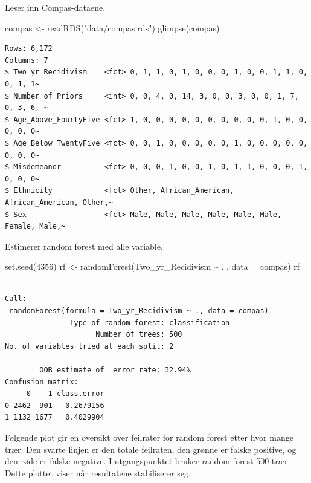 \documentclass[
  letterpaper,
  DIV=11,
  numbers=noendperiod]{scrreprt}
\newenvironment{Shaded}{\begin{snugshade}}{\end{snugshade}}
\newcommand{\AttributeTok}[1]{\textcolor[rgb]{0.40,0.45,0.13}{#1}}
\newcommand{\DecValTok}[1]{\textcolor[rgb]{0.68,0.00,0.00}{#1}}
\newcommand{\FunctionTok}[1]{\textcolor[rgb]{0.28,0.35,0.67}{#1}}
\newcommand{\NormalTok}[1]{\textcolor[rgb]{0.00,0.23,0.31}{#1}}
\newcommand{\OtherTok}[1]{\textcolor[rgb]{0.00,0.23,0.31}{#1}}
\newcommand{\SpecialCharTok}[1]{\textcolor[rgb]{0.37,0.37,0.37}{#1}}
\newcommand{\StringTok}[1]{\textcolor[rgb]{0.13,0.47,0.30}{#1}}
\begin{document}
Leser inn Compas-dataene.

\begin{Shaded}
\begin{Highlighting}[]
\NormalTok{compas }\OtherTok{\textless{}{-}} \FunctionTok{readRDS}\NormalTok{(}\StringTok{"data/compas.rds"}\NormalTok{)}
\FunctionTok{glimpse}\NormalTok{(compas)}
\end{Highlighting}
\end{Shaded}

\begin{verbatim}
Rows: 6,172
Columns: 7
$ Two_yr_Recidivism    <fct> 0, 1, 1, 0, 1, 0, 0, 0, 1, 0, 0, 1, 1, 0, 0, 1, 1~
$ Number_of_Priors     <int> 0, 0, 4, 0, 14, 3, 0, 0, 3, 0, 0, 1, 7, 0, 3, 6, ~
$ Age_Above_FourtyFive <fct> 1, 0, 0, 0, 0, 0, 0, 0, 0, 0, 0, 1, 0, 0, 0, 0, 0~
$ Age_Below_TwentyFive <fct> 0, 0, 1, 0, 0, 0, 0, 0, 1, 0, 0, 0, 0, 0, 0, 0, 0~
$ Misdemeanor          <fct> 0, 0, 0, 1, 0, 0, 1, 0, 1, 1, 0, 0, 0, 1, 0, 0, 0~
$ Ethnicity            <fct> Other, African_American, African_American, Other,~
$ Sex                  <fct> Male, Male, Male, Male, Male, Male, Female, Male,~
\end{verbatim}

Estimerer random forest med alle variable.

\begin{Shaded}
\begin{Highlighting}[]
\FunctionTok{set.seed}\NormalTok{(}\DecValTok{4356}\NormalTok{)}
\NormalTok{rf }\OtherTok{\textless{}{-}} \FunctionTok{randomForest}\NormalTok{(Two\_yr\_Recidivism }\SpecialCharTok{\textasciitilde{}}\NormalTok{ . ,}
                    \AttributeTok{data =}\NormalTok{ compas)}
\NormalTok{rf}
\end{Highlighting}
\end{Shaded}

\begin{verbatim}

Call:
 randomForest(formula = Two_yr_Recidivism ~ ., data = compas) 
               Type of random forest: classification
                     Number of trees: 500
No. of variables tried at each split: 2

        OOB estimate of  error rate: 32.94%
Confusion matrix:
     0    1 class.error
0 2462  901   0.2679156
1 1132 1677   0.4029904
\end{verbatim}

Følgende plot gir en oversikt over feilrater for random forest etter
hvor mange trær. Den svarte linjen er den totale feilraten, den grønne
er falske positive, og den røde er falske negative. I utgangspunktet
bruker random forest 500 trær. Dette plottet viser når resultatene
stabiliserer seg.
\end{document}
